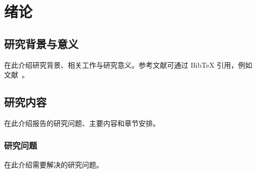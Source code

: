 \chapter{绪论}
\section{研究背景与意义}
在此介绍研究背景、相关工作与研究意义。参考文献可通过 BibTeX 引用，例如文献~\cite{goodfellow2016deep}。
\section{研究内容}
在此介绍报告的研究问题、主要内容和章节安排。
\subsection{研究问题}
在此介绍需要解决的研究问题。
